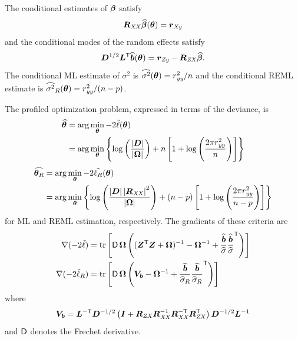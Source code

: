 \documentclass[12pt]{article}
\begin{document}
The conditional estimates of $\bm{\beta}$ satisfy
\begin{equation}
  \label{eq:betaHat}
  \bm{R}_\mathit{XX}\widehat{\bm{\beta}}(\bm{\theta})=\bm{r}_\mathit{Xy}
\end{equation}
and the conditional modes of the random effects satisfy
\begin{equation}
  \label{eq:ConditionalExp}
  \bm{D}^{1/2}\bm{L}^\mathsf{T}\widehat{\bm{b}}(\bm{\theta})=\bm{r}_\mathit{Zy}-\bm{R}_\mathit{ZX}\widehat{\bm{\beta}} .
\end{equation}
The conditional ML estimate of $\sigma^2$ is
$\widehat{\sigma^2}(\bm{\theta})=r_\mathit{yy}^2/n$ and the conditional REML
estimate is $\widehat{\sigma^2}_R(\bm{\theta})=r_\mathit{yy}^2/(n-p)$.

The profiled optimization problem, expressed in terms of the
deviance, is
\begin{equation}
  \label{eq:ProfiledLogLik}
  \begin{aligned}
    \widehat{\bm{\theta}}&=\arg\min_{\bm{\theta}} -2\tilde{\ell}(\bm{\theta})\\
    &=\arg\min_{\bm{\theta}}\left\{\log\left(\frac{\left|\bm{D}\right|}
      {\left|\bm{\Omega}\right|}\right)
    + n\left[1+\log\left(\frac{2\pi r_\mathit{yy}^2}{n}\right)\right]\right\}
  \end{aligned}
\end{equation}
\begin{equation}
  \label{eq:ProfiledLogRestLik}
  \begin{aligned}
    \widehat{\bm{\theta}_R}&=\arg\min_{\bm{\theta}} -2\tilde{\ell_R}(\bm{\theta})\\
    &=\arg\min_{\bm{\theta}}\left\{\log\left(\frac{\left|\bm{D}\right|\left|\bm{R}_\mathit{XX}\right|^2}
      {\left|\bm{\Omega}\right|}\right)
    +  (n-p)\left[1+\log\left(\frac{2\pi r_\mathit{yy}^2}{n-p}\right)\right]\right\}
  \end{aligned}
\end{equation}
for ML and REML estimation, respectively.  The gradients of these
criteria are
\begin{align}
  \label{eq:gradDev}
  \nabla(-2\tilde\ell)&=\operatorname{tr}\left[\operatorname{\mathsf{D}}\bm{\Omega}\left(
      (\bm{Z}^\mathsf{T}\bm{Z}+\bm{\Omega})^{-1}-\bm{\Omega}^{-1}+
      \frac{\widehat{\bm{b}}}{\widehat{\sigma}}
      \frac{\widehat{\bm{b}}}{\widehat{\sigma}}^\mathsf{T}\right)\right]\\
  \label{eq:gradDevRest}
  \nabla(-2\tilde\ell_R)&=\operatorname{tr}\left[\operatorname{\mathsf{D}}\bm{\Omega}\left(
      \bm{V}_{\bm{b}}-\bm{\Omega}^{-1}+
      \frac{\widehat{\bm{b}}}{\widehat{\sigma}_R}
      \frac{\widehat{\bm{b}}}{\widehat{\sigma}_R}^\mathsf{T}\right)\right]
\end{align}
where
\begin{equation}
  \label{eq:vbDef}
  \bm{V}_{\bm{b}}=\bm{L}^{-\mathsf{T}}\bm{D}^{-1/2}\left(\bm{I}+\bm{R}_\mathit{ZX}\bm{R}_\mathit{XX}^{-1}\bm{R}_\mathit{XX}^{-\mathsf{T}}
    \bm{R}_\mathit{ZX}^\mathsf{T}\right)\bm{D}^{-1/2}\bm{L}^{-1}
\end{equation}
and $\operatorname{\mathsf{D}}$ denotes the Frechet derivative.
\end{document}
